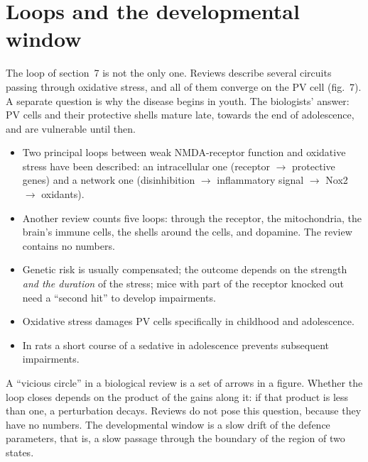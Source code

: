 \section{Loops and the developmental window}
The loop of section~7 is not the only one. Reviews describe several circuits passing through oxidative stress, and all of them converge on the PV cell (fig.~7). A separate question is why the disease begins in youth. The biologists' answer: PV cells and their protective shells mature late, towards the end of adolescence, and are vulnerable until then.
\facts
\begin{itemize}
\item Two principal loops between weak NMDA-receptor function and oxidative stress have been described: an intracellular one (receptor $\to$ protective genes) and a network one (disinhibition $\to$ inflammatory signal $\to$ Nox2 $\to$ oxidants).\tS
\item Another review counts five loops: through the receptor, the mitochondria, the brain's immune cells, the shells around the cells, and dopamine. The review contains no numbers.\tS
\item Genetic risk is usually compensated; the outcome depends on the strength \emph{and the duration} of the stress; mice with part of the receptor knocked out need a ``second hit'' to develop impairments.\tS
\item Oxidative stress damages PV cells specifically in childhood and adolescence.\tS
\item In rats a short course of a sedative in adolescence prevents subsequent impairments.\tS
\end{itemize}
\begin{ineq}
A ``vicious circle'' in a biological review is a set of arrows in a figure. Whether the loop closes depends on the product of the gains along it: if that product is less than one, a perturbation decays. Reviews do not pose this question, because they have no numbers. The developmental window is a slow drift of the defence parameters, that is, a slow passage through the boundary of the region of two states.
\end{ineq}
